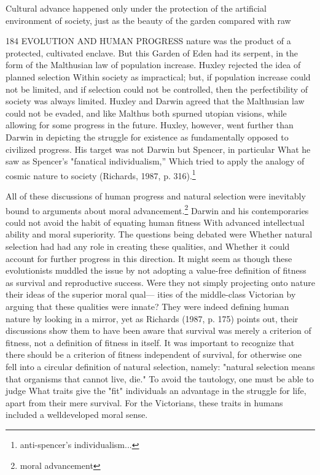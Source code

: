 \documentclass[12pt]{letter}
\begin{document}
Cultural advance happened only under the protection of the artificial environment of society, just as the beauty of the garden compared with raw


184 EVOLUTION AND HUMAN PROGRESS
nature was the product of a protected, cultivated enclave. But this Garden of Eden had its serpent, in the form of the Malthusian law of population increase. Huxley rejected the idea of planned selection Within society as impractical; but, if population increase could not be limited, and if selection could not be controlled, then the perfectibility of society was always limited. Huxley and Darwin agreed that the Malthusian law could not be evaded, and like Malthus both spurned utopian visions, while allowing for some progress in the future. Huxley, however, went further than Darwin in depicting the struggle for existence as fundamentally opposed to civilized progress. His target was not Darwin but Spencer, in particular What he saw as Spencer’s "fanatical individualism,” Which tried to apply the analogy of cosmic nature to society (Richards, 1987, p. 316).\footnote{anti-spencer's individualism...}

All of these discussions of human progress and natural selection were inevitably bound to arguments about moral advancement.\footnote{moral advancement} Darwin and his contemporaries could not avoid the habit of equating human fitness With advanced intellectual ability and moral superiority. The questions being debated were Whether natural selection had had any role in creating these qualities, and Whether it could account for further progress in this direction. It might seem as though these evolutionists muddled the issue by not adopting a value-free definition of fitness as survival and reproductive success. Were they not simply projecting onto nature their ideas of the superior moral qual— ities of the middle-class Victorian by arguing that these qualities were innate? They were indeed defining human nature by looking in a mirror, yet as Richards (1987, p. 175) points out, their discussions show them to have been aware that survival was merely a criterion of fitness, not a definition of fitness in itself. It was important to recognize that there should be a criterion of fitness independent of survival, for otherwise one fell into a circular definition of natural selection, namely: "natural selection means that organisms that cannot live, die." To avoid the tautology, one must be able to judge What traits give the "fit" individuals an advantage in the struggle for life, apart from their mere survival. For the Victorians, these traits in humans included a welldeveloped moral sense.
\end{document}
